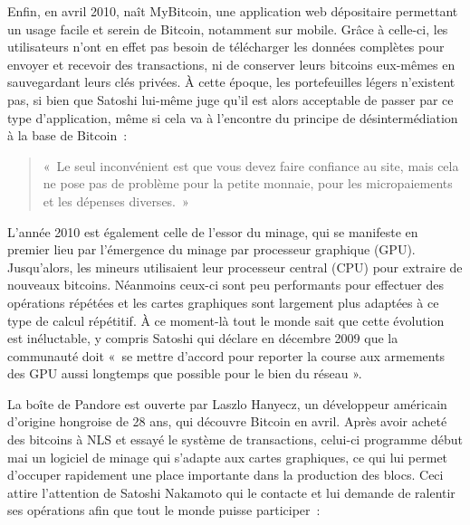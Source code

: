Enfin, en avril 2010, naît MyBitcoin, une application web dépositaire permettant un usage facile et serein de Bitcoin, notamment sur mobile. Grâce à celle-ci, les utilisateurs n'ont en effet pas besoin de télécharger les données complètes pour envoyer et recevoir des transactions, ni de conserver leurs bitcoins eux-mêmes en sauvegardant leurs clés privées. À cette époque, les portefeuilles légers n'existent pas, si bien que Satoshi lui-même juge qu'il est alors acceptable de passer par ce type d'application, même si cela va à l'encontre du principe de désintermédiation à la base de Bitcoin~:

\begin{quote}
«~Le seul inconvénient est que vous devez faire confiance au site, mais cela ne pose pas de problème pour la petite monnaie, pour les micropaiements et les dépenses diverses.~»
\end{quote}


L'année 2010 est également celle de l'essor du minage, qui se manifeste en premier lieu par l'émergence du minage par processeur graphique (GPU). Jusqu'alors, les mineurs utilisaient leur processeur central (CPU) pour extraire de nouveaux bitcoins. Néanmoins ceux-ci sont peu performants pour effectuer des opérations répétées et les cartes graphiques sont largement plus adaptées à ce type de calcul répétitif. À ce moment-là tout le monde sait que cette évolution est inéluctable, y compris Satoshi qui déclare en décembre 2009 que la communauté doit «~se mettre d'accord pour reporter la course aux armements des GPU aussi longtemps que possible pour le bien du réseau ».

La boîte de Pandore est ouverte par Laszlo Hanyecz, un développeur américain d'origine hongroise de 28 ans, qui découvre Bitcoin en avril. Après avoir acheté des bitcoins à NLS et essayé le système de transactions, celui-ci programme début mai un logiciel de minage qui s'adapte aux cartes graphiques, ce qui lui permet d'occuper rapidement une place importante dans la production des blocs. Ceci attire l'attention de Satoshi Nakamoto qui le contacte et lui demande de ralentir ses opérations afin que tout le monde puisse participer~:

